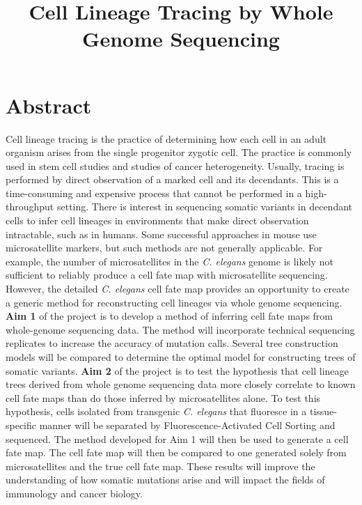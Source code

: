 \documentclass[12pt]{article}
\title{Cell Lineage Tracing by Whole Genome Sequencing}
\date{}
\begin{document}
\maketitle





\section{Abstract}

Cell lineage tracing is the practice of determining how each cell in an adult organism arises from the single progenitor zygotic cell.
The practice is commonly used in stem cell studies and studies of cancer heterogeneity.
Usually, tracing is performed by direct observation of a marked cell and its decendants.
This is a time-consuming and expensive process that cannot be performed in a high-throughput setting.
There is interest in sequencing somatic variants in decendant cells to infer cell lineages in environments that make direct observation intractable, such as in humans.
Some successful approaches in mouse use microsatellite markers, but such methods are not generally applicable.
For example, the number of microsatellites in the \textit{C. elegans} genome is likely not sufficient to reliably produce a cell fate map with microsatellite sequencing.
However, the detailed \textit{C. elegans} cell fate map provides an opportunity to create a generic method for reconstructing cell lineages via whole genome sequencing. 
\textbf{Aim 1} of the project is to develop a method of inferring cell fate maps from whole-genome sequencing data.
The method will incorporate technical sequencing replicates to increase the accuracy of mutation calls.
Several tree construction models will be compared to determine the optimal model for constructing trees of somatic variants.
\textbf{Aim 2} of the project is to test the hypothesis that cell lineage trees derived from whole genome sequencing data more closely correlate to known cell fate maps than do those inferred by microsatellites alone.
To test this hypothesis, cells isolated from transgenic \textit{C. elegans} that fluoresce in a tissue-specific manner will be separated by Fluorescence-Activated Cell Sorting and sequenced.
The method developed for Aim 1 will then be used to generate a cell fate map.
The cell fate map will then be compared to one generated solely from microsatellites and the true cell fate map.
These results will improve the understanding of how somatic mutations arise and will impact the fields of immunology and cancer biology.
\end{document}

